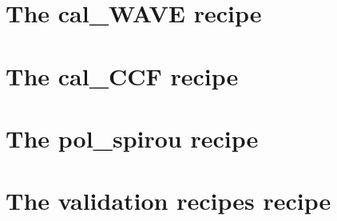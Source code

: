 \clearpage
\newpage
\section{The cal\_WAVE recipe}
\label{ch:the_recipes:cal_WAVE_E2DS_spirou}



\clearpage
\newpage
\section{The cal\_CCF recipe}
\label{ch:the_recipes:cal_CCF_E2DS_spirou}


\clearpage
\newpage
\section{The pol\_spirou recipe}
\label{ch:the_recipes:pol_spirou}


\clearpage
\newpage
\section{The validation recipes recipe}
\label{ch:the_recipes:cal_validate_spirou}
